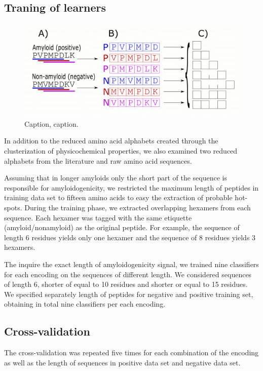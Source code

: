 \documentclass{bioinfo}
\begin{document}
\begin{methods}
\subsection{Traning of learners}


\begin{figure}[!tpb]%
\centerline{\includegraphics[width=\textwidth]{figures/ngram_scheme.png}}
\caption{Caption, caption.}\label{fig:01}
\end{figure}

In addition to the reduced amino acid alphabets created through the clusterization of physicochemical properties, we also examined two reduced alphabets from the literature and raw amino acid sequences.  

Assuming that in longer amyloids only the short part of the sequence is responsible for amyloidogenicity, 
we restricted the maximum length of peptides in training data set to fifteen amino acids to easy the extraction of probable hot-spots. During the training phase, we extracted overlapping hexamers from each sequence. Each hexamer was tagged with the same etiquette (amyloid/nonamyloid) as the original peptide. For example, the sequence of length 6 residues yields only one hexamer and the sequence of 8 residues yields 3 hexamers. 

The inquire the exact length of amyloidogenicity signal, we trained nine classifiers for each encoding on the sequences of different length. We considered sequences of length 6, shorter of equal to 10 residues and shorter or equal to 15 residues. We specified separately length of peptides for negative and positive training set, obtaining in total nine classifiers per each encoding.

\subsection{Cross-validation}

The cross-validation was repeated five times for each combination of the encoding as well as the length of sequences in positive data set and negative data set.


\end{methods}
\end{document}
